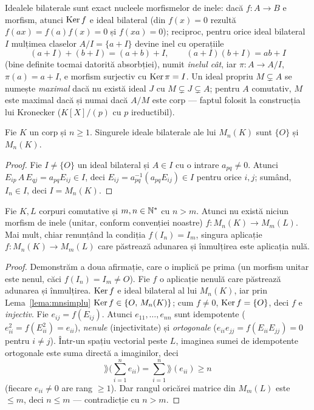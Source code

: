 \begin{observatie}\label{obs:idealcat}
Idealele bilaterale sunt exact nucleele morfismelor de inele: dacă $f:A\to B$ e morfism, atunci $\operatorname{Ker} f$ e ideal bilateral (din $f(x)=0$ rezultă $f(ax)=f(a)f(x)=0$ și $f(xa)=0$); reciproc, pentru orice ideal bilateral $I$ mulțimea claselor $A/I=\{a+I\}$ devine inel cu operațiile
\[
(a+I)+(b+I)=(a+b)+I,\qquad (a+I)(b+I)=ab+I
\]
(bine definite tocmai datorită absorbției), numit \emph{inelul cât}, iar $\pi:A\to A/I$, $\pi(a)=a+I$, e morfism surjectiv cu $\operatorname{Ker}\pi=I$. Un ideal propriu $M\subsetneq A$ se numește \emph{maximal} dacă nu există ideal $J$ cu $M\subsetneq J\subsetneq A$; pentru $A$ comutativ, $M$ este maximal dacă și numai dacă $A/M$ este corp --- faptul folosit la construcția lui Kronecker ($K[X]/(p)$ cu $p$ ireductibil).
\end{observatie}

\begin{lema}\label{lema:mnsimplu}
Fie $K$ un corp și $n\ge1$. Singurele ideale bilaterale ale lui $M_n(K)$ sunt $\{O\}$ și $M_n(K)$.
\end{lema}
\begin{proof}
Fie $I\neq\{O\}$ un ideal bilateral și $A\in I$ cu o intrare $a_{pq}\neq0$. Atunci $E_{ip}\,A\,E_{qj}=a_{pq}E_{ij}\in I$, deci $E_{ij}=a_{pq}^{-1}(a_{pq}E_{ij})\in I$ pentru orice $i,j$; sumând, $I_n\in I$, deci $I=M_n(K)$.
\end{proof}

\begin{propozitie}\label{prop:morfmatrice}
Fie $K,L$ corpuri comutative și $m,n\in\mathbb{N}^*$ cu $n>m$. Atunci nu există niciun morfism de inele (unitar, conform convenției noastre) $f:M_n(K)\to M_m(L)$. Mai mult, chiar renunțând la condiția $f(I_n)=I_m$, singura aplicație $f:M_n(K)\to M_m(L)$ care păstrează adunarea și înmulțirea este aplicația nulă.
\end{propozitie}
\begin{proof}
Demonstrăm a doua afirmație, care o implică pe prima (un morfism unitar este nenul, căci $f(I_n)=I_m\neq O$). Fie $f$ o aplicație nenulă care păstrează adunarea și înmulțirea. $\operatorname{Ker} f$ e ideal bilateral al lui $M_n(K)$, iar prin Lema~\ref{lema:mnsimplu} $\operatorname{Ker} f\in\{O,\,M_n(K)\}$; cum $f\neq0$, $\operatorname{Ker} f=\{O\}$, deci $f$ e \emph{injectiv}. Fie $e_{ij}=f(E_{ij})$. Atunci $e_{11},\dots,e_{nn}$ sunt idempotente ($e_{ii}^2=f(E_{ii}^2)=e_{ii}$), \emph{nenule} (injectivitate) și \emph{ortogonale} ($e_{ii}e_{jj}=f(E_{ii}E_{jj})=0$ pentru $i\neq j$). Într-un spațiu vectorial peste $L$, imaginea sumei de idempotente ortogonale este suma directă a imaginilor, deci
\[
\rang\Big(\sum_{i=1}^n e_{ii}\Big)=\sum_{i=1}^n\rang(e_{ii})\ge n
\]
(fiecare $e_{ii}\neq0$ are rang $\ge1$). Dar rangul oricărei matrice din $M_m(L)$ este $\le m$, deci $n\le m$ --- contradicție cu $n>m$.
\end{proof}

